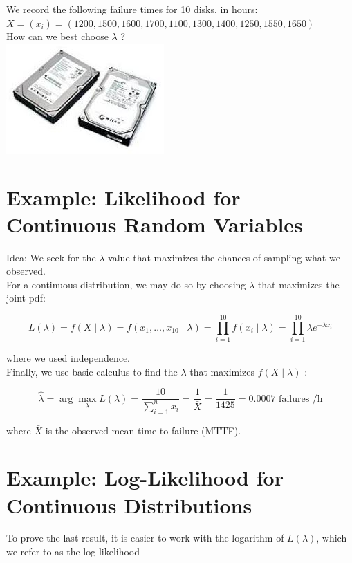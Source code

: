 \documentclass[10pt]{article}
\begin{document}
We record the following failure times for 10 disks, in hours:\\
$X=\left(x_{i}\right)=(1200,1500,1600,1700,1100,1300,1400,1250,1550,1650)$\\
How can we best choose $\lambda$ ?\\
\includegraphics[max width=\textwidth, center]{2025_05_12_2c033a5f0417cd8b136fg-17}

\section*{Example: Likelihood for Continuous Random Variables}
Idea: We seek for the $\lambda$ value that maximizes the chances of sampling what we observed.\\
For a continuous distribution, we may do so by choosing $\lambda$ that maximizes the joint pdf:

$$
L(\lambda)=f(X \mid \lambda)=f\left(x_{1}, \ldots, x_{10} \mid \lambda\right)=\prod_{i=1}^{10} f\left(x_{i} \mid \lambda\right)=\prod_{i=1}^{10} \lambda e^{-\lambda x_{i}}
$$

where we used independence.\\
Finally, we use basic calculus to find the $\lambda$ that maximizes $f(X \mid \lambda)$ :

$$
\widehat{\lambda}=\arg \max _{\lambda} L(\lambda)=\frac{10}{\sum_{i=1}^{n} x_{i}}=\frac{1}{\bar{X}}=\frac{1}{1425}=0.0007 \text { failures } / \mathrm{h}
$$

where $\bar{X}$ is the observed mean time to failure (MTTF).

\section*{Example: Log-Likelihood for Continuous Distributions}
To prove the last result, it is easier to work with the logarithm of $L(\lambda)$, which we refer to as the log-likelihood
\end{document}
